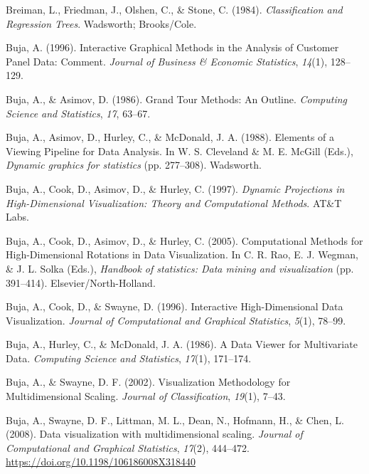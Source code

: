 \documentclass[
  letterpaper,
]{krantz}
\newlength{\cslhangindent}
\newenvironment{CSLReferences}[2] %
 {\begin{list}{}{%
  \setlength{\itemindent}{0pt}
  \setlength{\leftmargin}{0pt}
  \setlength{\parsep}{0pt}
  \ifodd #1
   \setlength{\leftmargin}{\cslhangindent}
   \setlength{\itemindent}{-1\cslhangindent}
  \fi
  \setlength{\itemsep}{#2\baselineskip}}}
 {\end{list}}
\begin{document}
\begin{CSLReferences}{1}{0}
Breiman, L., Friedman, J., Olshen, C., \& Stone, C. (1984).
\emph{Classification and {R}egression {T}rees}. Wadsworth; Brooks/Cole.

Buja, A. (1996). Interactive {G}raphical {M}ethods in the {A}nalysis of
{C}ustomer {P}anel {D}ata: {C}omment. \emph{Journal of Business \&
Economic Statistics}, \emph{14}(1), 128--129.

Buja, A., \& Asimov, D. (1986). {G}rand {T}our {M}ethods: {A}n
{O}utline. \emph{Computing Science and Statistics}, \emph{17}, 63--67.

Buja, A., Asimov, D., Hurley, C., \& McDonald, J. A. (1988). {E}lements
of a {V}iewing {P}ipeline for {D}ata {A}nalysis. In W. S. Cleveland \&
M. E. McGill (Eds.), \emph{Dynamic graphics for statistics} (pp.
277--308). Wadsworth.

Buja, A., Cook, D., Asimov, D., \& Hurley, C. (1997). \emph{Dynamic
{P}rojections in {H}igh-{D}imensional {V}isualization: {T}heory and
{C}omputational {M}ethods}. AT\&{T} Labs.

Buja, A., Cook, D., Asimov, D., \& Hurley, C. (2005). {C}omputational
{M}ethods for {H}igh-{D}imensional {R}otations in {D}ata
{V}isualization. In C. R. Rao, E. J. Wegman, \& J. L. Solka (Eds.),
\emph{Handbook of statistics: Data mining and visualization} (pp.
391--414). Elsevier/North-Holland.

Buja, A., Cook, D., \& Swayne, D. (1996). {I}nteractive
{H}igh-{D}imensional {D}ata {V}isualization. \emph{Journal of
Computational and Graphical Statistics}, \emph{5}(1), 78--99.

Buja, A., Hurley, C., \& McDonald, J. A. (1986). A {D}ata {V}iewer for
{M}ultivariate {D}ata. \emph{Computing Science and Statistics},
\emph{17}(1), 171--174.

Buja, A., \& Swayne, D. F. (2002). Visualization {M}ethodology for
{M}ultidimensional {S}caling. \emph{Journal of Classification},
\emph{19}(1), 7--43.

Buja, A., Swayne, D. F., Littman, M. L., Dean, N., Hofmann, H., \& Chen,
L. (2008). Data visualization with multidimensional scaling.
\emph{Journal of Computational and Graphical Statistics}, \emph{17}(2),
444--472. \url{https://doi.org/10.1198/106186008X318440}


\end{CSLReferences}
\end{document}
